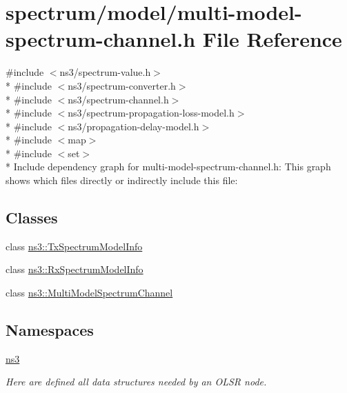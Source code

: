 \hypertarget{multi-model-spectrum-channel_8h}{}\section{spectrum/model/multi-\/model-\/spectrum-\/channel.h File Reference}
\label{multi-model-spectrum-channel_8h}
{\ttfamily \#include $<$ns3/spectrum-\/value.\+h$>$}\\*
{\ttfamily \#include $<$ns3/spectrum-\/converter.\+h$>$}\\*
{\ttfamily \#include $<$ns3/spectrum-\/channel.\+h$>$}\\*
{\ttfamily \#include $<$ns3/spectrum-\/propagation-\/loss-\/model.\+h$>$}\\*
{\ttfamily \#include $<$ns3/propagation-\/delay-\/model.\+h$>$}\\*
{\ttfamily \#include $<$map$>$}\\*
{\ttfamily \#include $<$set$>$}\\*
Include dependency graph for multi-\/model-\/spectrum-\/channel.h\+:
This graph shows which files directly or indirectly include this file\+:
\subsection*{Classes}
\begin{DoxyCompactItemize}
\item 
class \hyperlink{classns3_1_1TxSpectrumModelInfo}{ns3\+::\+Tx\+Spectrum\+Model\+Info}
\item 
class \hyperlink{classns3_1_1RxSpectrumModelInfo}{ns3\+::\+Rx\+Spectrum\+Model\+Info}
\item 
class \hyperlink{classns3_1_1MultiModelSpectrumChannel}{ns3\+::\+Multi\+Model\+Spectrum\+Channel}
\end{DoxyCompactItemize}
\subsection*{Namespaces}
\begin{DoxyCompactItemize}
\item 
 \hyperlink{namespacens3}{ns3}
\begin{DoxyCompactList}\small\item\em Here are defined all data structures needed by an O\+L\+SR node. \end{DoxyCompactList}\end{DoxyCompactItemize}
